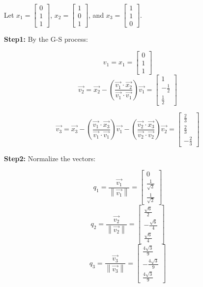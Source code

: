 \documentclass[11pt]{article} %
\newcommand{\norm}[1]{\left\lVert#1\right\rVert}
\begin{document}
Let $x_1=\begin{bmatrix}
	0\\1\\1
\end{bmatrix}$, $x_2=\begin{bmatrix}
1\\0\\1
\end{bmatrix}$, and $x_3=\begin{bmatrix}
1\\1\\0
\end{bmatrix}$.
	
	
\textbf{Step1:} By the G-S process:

$$v_1=x_1=\begin{bmatrix}
	0\\1\\1
\end{bmatrix}$$
$$\vec{v_2}=\vec{x_2}-(\frac{\vec{v_1}\cdot \vec{x_2}}{\vec{v_1}\cdot \vec{v_1}})\vec{v_1}=\begin{bmatrix}
	1\\ -\frac{1}{2}\\\frac{1}{2}
\end{bmatrix}$$
	
$$\vec{v_3}=\vec{x_3}-(\frac{\vec{v_1}\cdot \vec{x_3}}{\vec{v_1}\cdot\vec{v_1}})\vec{v_1}-(\frac{\vec{v_2}\cdot \vec{x_3}}{\vec{v_2}\cdot \vec{v_2}})\vec{v_2}=\begin{bmatrix}
	\frac{2}{3}\\\frac{2}{3}\\-\frac{2}{3}
\end{bmatrix}$$

\textbf{Step2:} Normalize the vectors:

$$q_1=\frac{\vec{v_1}}{\norm{\vec{v_1}}}=\begin{bmatrix}
	0\\\frac{1}{\sqrt{2}}\\\frac{1}{\sqrt{2}}
\end{bmatrix}$$
	$$q_2=\frac{\vec{v_2}}{\norm{\vec{v_2}}}=\begin{bmatrix}
		\frac{\sqrt{6}}{2}\\-\frac{\sqrt{6}}{4}\\\frac{\sqrt{6}}{4}
	\end{bmatrix}$$
$$q_3=\frac{\vec{v_3}}{\norm{\vec{v_3}}}=\begin{bmatrix}
	\frac{4\sqrt{3}}{9}\\-\frac{4\sqrt{3}}{9}\\\frac{4\sqrt{3}}{9}
\end{bmatrix}$$
\end{document}
